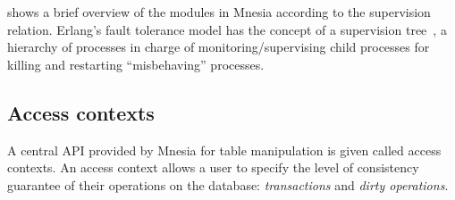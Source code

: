  shows a brief overview of the modules in Mnesia according
to the supervision relation.
Erlang's fault tolerance model has the concept of a supervision tree~\cite{ericssonab2023otpdesign},
a hierarchy of processes in charge of monitoring/supervising child processes
for killing and restarting ``misbehaving'' processes. 






\subsection{Access contexts} \label{subsec:mnesia access contexts}

A central API provided by Mnesia for table manipulation is given called access
contexts. An access context allows a user to specify the level of consistency 
guarantee of their operations on the database: \emph{transactions} and
\emph{dirty operations}.

